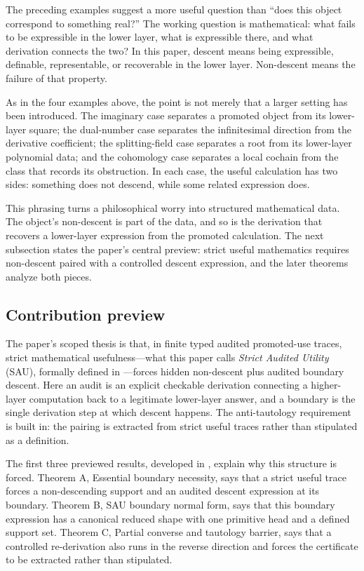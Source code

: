 \documentclass[11pt]{article}
\theoremstyle{definition}
\begin{document}
The preceding examples suggest a more useful question than ``does this object
correspond to something real?''  The working question is mathematical: what
fails to be expressible in the lower layer, what is expressible there, and
what derivation connects the two?  In this paper, descent means being
expressible, definable, representable, or recoverable in the lower layer.
Non-descent means the failure of that property.

As in the four examples above, the point is not merely that a larger setting
has been introduced.  The imaginary case separates a promoted object from its
lower-layer square; the dual-number case separates the infinitesimal direction
from the derivative coefficient; the splitting-field case separates a root
from its lower-layer polynomial data; and the cohomology case separates a
local cochain from the class that records its obstruction.  In each case, the
useful calculation has two sides: something does not descend, while some
related expression does.

This phrasing turns a philosophical worry into structured mathematical data.
The object's non-descent is part of the data, and so is the derivation that
recovers a lower-layer expression from the promoted calculation.  The next
subsection states the paper's central preview: strict useful mathematics
requires non-descent paired with a controlled descent expression, and the
later theorems analyze both pieces.

\subsection{Contribution preview}
\label{subsec:intro-contribution-preview}

The paper's scoped thesis is that, in finite typed audited promoted-use
traces, strict mathematical usefulness---what this paper calls
\emph{Strict Audited Utility} (SAU), formally defined in
---forces hidden non-descent plus audited boundary descent.
Here an audit is an explicit checkable derivation connecting a higher-layer
computation back to a legitimate lower-layer answer, and a boundary is the
single derivation step at which descent happens.  The anti-tautology
requirement is built in: the pairing is extracted from strict useful traces
rather than stipulated as a definition.

The first three previewed results, developed in , explain
why this structure is forced.  Theorem A, Essential boundary necessity, says
that a strict useful trace forces a non-descending support and an audited
descent expression at its boundary.  Theorem B, SAU boundary normal form, says
that this boundary expression has a canonical reduced shape with one primitive
head and a defined support set.  Theorem C, Partial converse and tautology
barrier, says that a controlled re-derivation also runs in the reverse
direction and forces the certificate to be extracted rather than stipulated.
\end{document}
